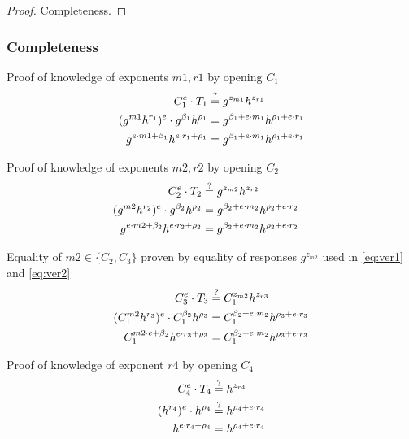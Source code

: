 \begin{proof}
    Completeness. 
\end{proof}













\subsubsection{Completeness}
Proof of knowledge of exponents $m1, r1$ by opening $C_1$ 
\begin{align}
    C_1^e \cdot T_1 &\stackrel{?}{=} g^{z_{m1}} h^{z_{r1}} \notag \\
    (g^{m1}h^{r_1})^e \cdot g^{\beta_1}h^{\rho_1} &= g^{\beta_1 + e \cdot m_1} h^{\rho_1 + e \cdot r_1} \notag \\
    g^{e \cdot m1 + \beta_1}h^{e \cdot r_1 + \rho_1} &= g^{\beta_1 + e \cdot m_1} h^{\rho_1 + e \cdot r_1} \notag 
\end{align}

Proof of knowledge of exponents $m2, r2$ by opening $C_2$ 
\begin{align}
    C_2^e \cdot T_2 &\stackrel{?}{=} g^{z_{m2}} h^{z_{r2}} && \label{eq:ver1} \\
    (g^{m2}h^{r_2})^e \cdot g^{\beta_2}h^{\rho_2} &= g^{\beta_2 + e \cdot m_2} h^{\rho_2 + e \cdot r_2} \notag \\
    g^{e \cdot m2 + \beta_2}h^{e \cdot r_2 + \rho_2} &= g^{\beta_2 + e \cdot m_2} h^{\rho_2 + e \cdot r_2} \notag 
\end{align}


Equality of $m2 \in \{C_2, C_3\}$ proven by equality of responses $g^{z_{m2}}$ used in \eqref{eq:ver1} and \eqref{eq:ver2}
\begin{align}
    C_3^e \cdot T_3 &\stackrel{?}{=} C_1^{z_{m2}} h^{z_{r3}} \notag \\
    (C_1^{m2}h^{r_3})^e \cdot C_1^{\beta_2}h^{\rho_3} &= C_1^{\beta_2 + e \cdot m_2} h^{\rho_3 + e \cdot r_3} \label{eq:ver2} \\
    C_1^{m2 \cdot e + \beta_2}h^{e \cdot r_3 + \rho_3} &= C_1^{\beta_2 + e \cdot m_2} h^{\rho_3 + e \cdot r_3} \notag
\end{align}

Proof of knowledge of exponent $r4$ by opening $C_4$ 
\begin{align}
    C_4^e \cdot T_4 &\stackrel{?}{=} h^{z_{r4}} \notag \\
    (h^{r_4})^e \cdot h^{\rho_4} &\stackrel{?}{=} h^{\rho_4 + e \cdot r_4} \notag \\
    h^{e \cdot r_4 + \rho_4} &= h^{\rho_4 + e \cdot r_4} \notag
\end{align}


